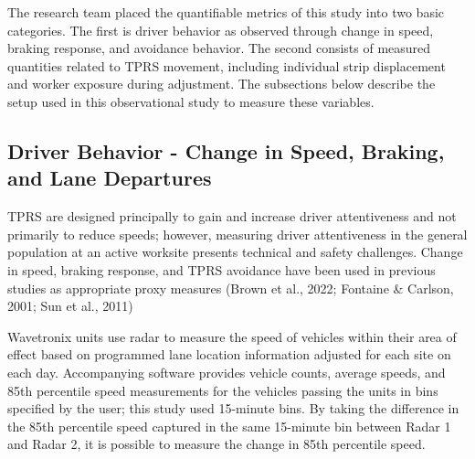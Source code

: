 \documentclass[
  letterpaper,
]{trb}
\begin{document}
\begin{table}

\caption{\label{tbl-wav-spacing}Separation {[}ft{]} Between Radar Units}


\end{table}%

The research team placed the quantifiable metrics of this study into two
basic categories. The first is driver behavior as observed through
change in speed, braking response, and avoidance behavior. The second
consists of measured quantities related to TPRS movement, including
individual strip displacement and worker exposure during adjustment. The
subsections below describe the setup used in this observational study to
measure these variables.

\subsection{Driver Behavior - Change in Speed, Braking, and Lane
Departures}\label{driver-behavior---change-in-speed-braking-and-lane-departures}

TPRS are designed principally to gain and increase driver attentiveness
and not primarily to reduce speeds; however, measuring driver
attentiveness in the general population at an active worksite presents
technical and safety challenges. Change in speed, braking response, and
TPRS avoidance have been used in previous studies as appropriate proxy
measures (Brown et al., 2022; Fontaine \& Carlson, 2001; Sun et al.,
2011)

Wavetronix units use radar to measure the speed of vehicles within their
area of effect based on programmed lane location information adjusted
for each site on each day. Accompanying software provides vehicle
counts, average speeds, and 85th percentile speed measurements for the
vehicles passing the units in bins specified by the user; this study
used 15-minute bins. By taking the difference in the 85th percentile
speed captured in the same 15-minute bin between Radar 1 and Radar 2, it
is possible to measure the change in 85th percentile speed.
\end{document}
